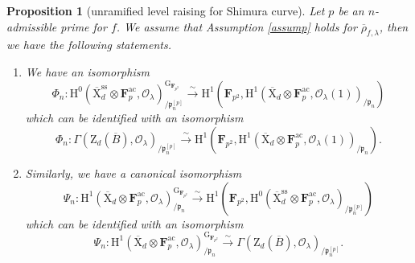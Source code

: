 \documentclass[10pt]{amsart}
\numberwithin{equation}{section}
\theoremstyle{plain}
\newtheorem{proposition}[theorem]{Proposition}
\numberwithin{equation}{section}
\theoremstyle{definition}
\theoremstyle{remark}
\def\ac{\mathrm{ac}}
\def\ss{\mathrm{ss}}
\def\ac{\mathrm{ac}}
\def\calO{\mathcal{O}}
\def\frakp{\mathfrak{p}}
\def\FF{\mathbf{F}}
\def\rmG{\mathrm{G}}
\def\rmH{\mathrm{H}}
\def\rmX{\mathrm{X}}
\def\rmZ{\mathrm{Z}}
\begin{document}
\begin{proposition}[unramified level raising for Shimura curve]\label{level-raise-curve}
Let $p$ be an $n$-admissible prime for $f$.  We assume that Assumption \ref{assump} holds for $\overline{\rho}_{f,\lambda}$, then we have the following statements.
\begin{enumerate}
\item We have an isomorphism
\begin{equation*}
\Phi_{n}: \rmH^{0}(\overline{\rmX}^{\ss}_{d}\otimes{\FF^{\ac}_{p}}, \calO_{\lambda})_{/\frakp^{[p]}_{n}}^{\rmG_{\FF_{p^{2}}}}\xrightarrow{\sim}  \rmH^{1}(\FF_{p^{2}}, \rmH^{1}(\overline{\rmX}_{d} \otimes{\FF^{\ac}_{p}}, \calO_{\lambda}(1))_{/\frakp_{n}})
\end{equation*}
which can be identified with an isomorphism
\begin{equation*}
\Phi_{n}: \Gamma(\rmZ_{d}(\overline{B}), \calO_{\lambda})_{/\frakp^{[p]}_{n}}\xrightarrow{\sim}  \rmH^{1}(\FF_{p^{2}}, \rmH^{1}(\overline{\rmX}_{d}\otimes{\FF^{\ac}_{p}}, \calO_{\lambda}(1))_{/\frakp_{n}}).
\end{equation*}

\item Similarly, we have a canonical isomorphism
\begin{equation*}
\Psi_{n}: \rmH^{1}(\overline{\rmX}_{d}\otimes{\FF^{\ac}_{p}}, \calO_{\lambda})^{\rmG_{\FF_{p^{2}}}}_{/\frakp_{n}}\xrightarrow{\sim} \rmH^{1}(\FF_{p^{2}}, \rmH^{0}(\overline{\rmX}^{\ss}_{d}\otimes{\FF^{\ac}_{p}}, \calO_{\lambda})_{/\frakp^{[p]}_{n}})
\end{equation*}
which can be identified with an isomorphism
\begin{equation*}
\Psi_{n}: \rmH^{1}(\overline{\rmX}_{d}\otimes{\FF^{\ac}_{p}}, \calO_{\lambda})_{/\frakp_{n}}^{\rmG_{\FF_{p^{2}}}}\xrightarrow{\sim}  \Gamma(\rmZ_{d}(\overline{B}), \calO_{\lambda})_{/\frakp^{[p]}_{n}}.
\end{equation*}
\end{enumerate}
\end{proposition}
\end{document}
